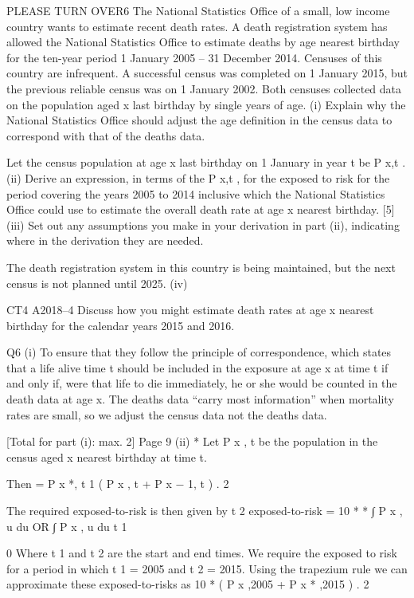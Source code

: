 \documentclass[a4paper,12pt]{article}
\begin{document}
PLEASE TURN OVER6
The National Statistics Office of a small, low income country wants to estimate recent
death rates. A death registration system has allowed the National Statistics Office to
estimate deaths by age nearest birthday for the ten-year period 1 January 2005 –
31 December 2014.
Censuses of this country are infrequent. A successful census was completed on
1 January 2015, but the previous reliable census was on 1 January 2002. Both
censuses collected data on the population aged x last birthday by single years of age.
(i)
Explain why the National Statistics Office should adjust the age definition in
the census data to correspond with that of the deaths data.

Let the census population at age x last birthday on 1 January in year t be P x,t .
(ii) Derive an expression, in terms of the P x,t , for the exposed to risk for the period
covering the years 2005 to 2014 inclusive which the National Statistics Office
could use to estimate the overall death rate at age x nearest birthday.
[5]
(iii) Set out any assumptions you make in your derivation in part (ii), indicating
where in the derivation they are needed.

The death registration system in this country is being maintained, but the next census
is not planned until 2025.
(iv)

CT4 A2018–4
Discuss how you might estimate death rates at age x nearest birthday for the
calendar years 2015 and 2016.



Q6
(i)
To ensure that they follow the principle of correspondence, 
which states that a life alive time t should be included in the exposure
at age x at time t if and only if, were that life to die immediately, he
or she would be counted in the death data at age x. 
The deaths data “carry most information” when mortality rates are small,
so we adjust the census data not the deaths data.

[Total for part (i): max. 2]
Page 9
(ii)
*
Let P x , t be the population in the census aged x nearest birthday at
time t.

Then
=
P x *, t
1
( P x , t + P x − 1, t ) .
2

The required exposed-to-risk is then given by
t 2
exposed-to-risk =
10
*
*
∫ P x , u du OR ∫ P x , u du
t 1

0
Where t 1 and t 2 are the start and end times.
We require the exposed to risk for a period in which t 1 = 2005 and
t 2 = 2015. 
Using the trapezium rule 
we can approximate these exposed-to-risks as
10 *
( P x ,2005 + P x * ,2015 ) .
2
\end{document}
